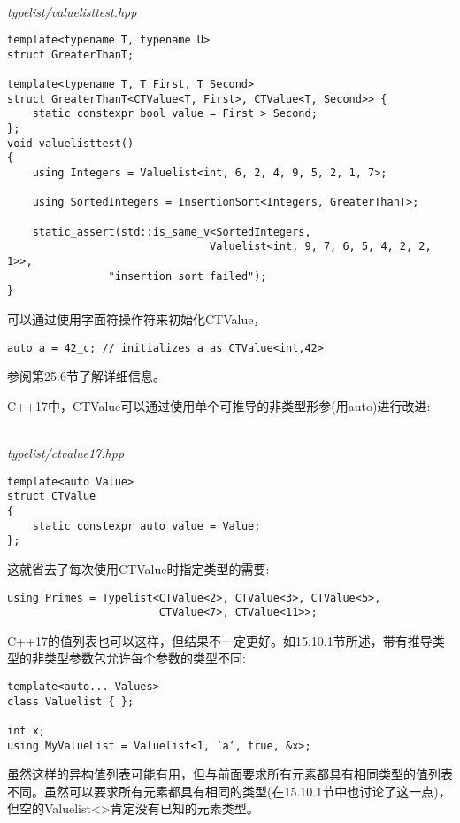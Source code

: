 \hspace*{\fill} \\ %
\noindent
\textit{typelist/valuelisttest.hpp}
\begin{lstlisting}[style=styleCXX]
template<typename T, typename U>
struct GreaterThanT;

template<typename T, T First, T Second>
struct GreaterThanT<CTValue<T, First>, CTValue<T, Second>> {
	static constexpr bool value = First > Second;
};
void valuelisttest()
{
	using Integers = Valuelist<int, 6, 2, 4, 9, 5, 2, 1, 7>;
	
	using SortedIntegers = InsertionSort<Integers, GreaterThanT>;
	
	static_assert(std::is_same_v<SortedIntegers,
								Valuelist<int, 9, 7, 6, 5, 4, 2, 2, 1>>,
				"insertion sort failed");
}
\end{lstlisting}

可以通过使用字面符操作符来初始化CTValue，

\begin{lstlisting}[style=styleCXX]
auto a = 42_c; // initializes a as CTValue<int,42>
\end{lstlisting}

参阅第25.6节了解详细信息。


C++17中，CTValue可以通过使用单个可推导的非类型形参(用auto)进行改进:

\hspace*{\fill} \\ %
\noindent
\textit{typelist/ctvalue17.hpp}
\begin{lstlisting}[style=styleCXX]
template<auto Value>
struct CTValue
{
	static constexpr auto value = Value;
};
\end{lstlisting}

这就省去了每次使用CTValue时指定类型的需要:

\begin{lstlisting}[style=styleCXX]
using Primes = Typelist<CTValue<2>, CTValue<3>, CTValue<5>,
						CTValue<7>, CTValue<11>>;
\end{lstlisting}

C++17的值列表也可以这样，但结果不一定更好。如15.10.1节所述，带有推导类型的非类型参数包允许每个参数的类型不同:

\begin{lstlisting}[style=styleCXX]
template<auto... Values>
class Valuelist { };

int x;
using MyValueList = Valuelist<1, ’a’, true, &x>;
\end{lstlisting}

虽然这样的异构值列表可能有用，但与前面要求所有元素都具有相同类型的值列表不同。虽然可以要求所有元素都具有相同的类型(在15.10.1节中也讨论了这一点)，但空的Valuelist<>肯定没有已知的元素类型。













